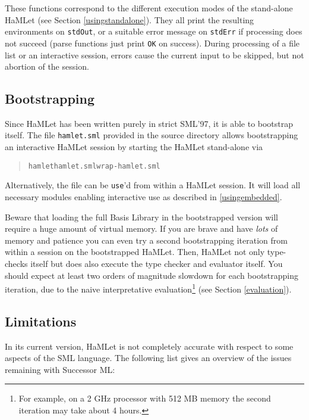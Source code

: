 \documentclass[twoside,titlepage]{article}
\begin{document}
These functions correspond to the different execution modes of the stand-alone HaMLet (see Section \ref{usingstandalone}). They all print the resulting environments on {\tt stdOut}, or a suitable error message on {\tt stdErr} if processing does not succeed (parse functions just print {\tt OK} on success). During processing of a file list or an interactive session, errors cause the current input to be skipped, but not abortion of the session.


\subsection{Bootstrapping}
\label{bootstrapping}

Since HaMLet has been written purely in strict SML'97, it is able to bootstrap itself. The file {\tt hamlet.sml} provided in the source directory allows bootstrapping an interactive HaMLet session by starting the HaMLet stand-alone via

\begin{quote}
\begin{alltt}
hamlet hamlet.sml wrap-hamlet.sml
\end{alltt}
\end{quote}

Alternatively, the file can be {\tt use}'d from within a HaMLet session. It will load all necessary modules enabling interactive use as described in \ref{usingembedded}.

Beware that loading the full Basis Library in the bootstrapped version will require a huge amount of virtual memory. If you are brave and have {\em lots} of memory and patience you can even try a second bootstrapping iteration from within a session on the bootstrapped HaMLet. Then, HaMLet not only type-checks itself but does also execute the type checker and evaluator itself. You should expect at least two orders of magnitude slowdown for each bootstrapping iteration, due to the naive interpretative evaluation\footnote{For example, on a 2 GHz processor with 512 MB memory the second iteration may take about 4 hours.} (see Section \ref{evaluation}).


\subsection{Limitations}
\label{limitations}

In its current version, HaMLet is not completely accurate with respect to some aspects of the SML language. The following list gives an overview of the issues remaining with Successor ML:
\end{document}
